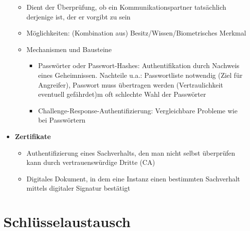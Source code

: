 \begin{itemize}
	\begin{itemize}
		\item Dient der Überprüfung, ob ein Kommunikationspartner tatsächlich derjenige ist, der er vorgibt zu sein
		\item Möglichkeiten: (Kombination aus) Besitz/Wissen/Biometrisches Merkmal
		\item Mechanismen und Bausteine
		\begin{itemize}
			\item Passwörter oder Passwort-Hashes: Authentifikation durch Nachweis eines Geheimnissen. Nachteile u.a.: Passwortliste notwendig (Ziel für Angreifer), Passwort muss übertragen werden (Vertraulichkeit eventuell gefährdet)m oft schlechte Wahl der Passwörter
			\item Challenge-Response-Authentifizierung: Vergleichbare Probleme wie bei Passwörtern
		\end{itemize}
	\end{itemize}
	\item \textbf{Zertifikate}
	\begin{itemize}
		\item Authentifizierung eines Sachverhalts, den man nicht selbst überprüfen kann durch vertrauenswürdige Dritte (CA)
		\item Digitales Dokument, in dem eine Instanz einen bestimmten Sachverhalt mittels digitaler Signatur bestätigt
	\end{itemize}
\end{itemize}



\section{Schlüsselaustausch}

